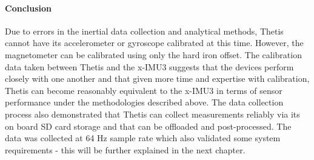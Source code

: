 \paragraph*{Conclusion} Due to errors in the inertial data collection and analytical methods, Thetis cannot have its accelerometer or gyroscope calibrated at this time.
However, the magnetometer can be calibrated using only the hard iron offset.
The calibration data taken between Thetis and the x-IMU3 suggests that the devices perform closely with one another and that given more time and expertise with calibration, Thetis can become reasonably equivalent to the x-IMU3 in terms of sensor performance under the methodologies described above.
The data collection process also demonstrated that Thetis can collect measurements reliably via its on board SD card storage and that can be offloaded and post-processed.
The data was collected at 64 Hz sample rate which also validated some system requirements - this will be further explained in the next chapter.